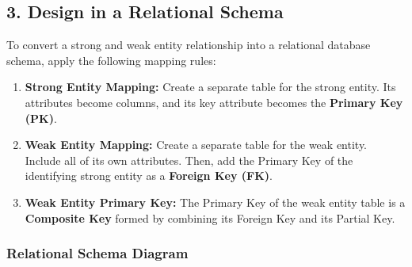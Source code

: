 \documentclass[12pt,a3paper]{article}
\begin{document}
\begin{enumerate}
\begin{tcolorbox}[enhanced,breakable,ansbox,colback=cA!4,colframe=cA,boxrule=0.8pt,arc=5pt,title={\textbf{Answer}},fonttitle=\bfseries\color{white},colbacktitle=cA]
\begin{center}
\end{center}
\vspace{1em}

\subsection*{3. Design in a Relational Schema}

To convert a strong and weak entity relationship into a relational database schema, apply the following mapping rules:

\begin{enumerate}
    \item \textbf{Strong Entity Mapping:} Create a separate table for the strong entity. Its attributes become columns, and its key attribute becomes the \textbf{Primary Key (PK)}.
    \item \textbf{Weak Entity Mapping:} Create a separate table for the weak entity. Include all of its own attributes. Then, add the Primary Key of the identifying strong entity as a \textbf{Foreign Key (FK)}.
    \item \textbf{Weak Entity Primary Key:} The Primary Key of the weak entity table is a \textbf{Composite Key} formed by combining its Foreign Key and its Partial Key.
\end{enumerate}

\subsubsection*{Relational Schema Diagram}

\vspace{1em}
\begin{center}
\end{center}
\end{tcolorbox}
\end{enumerate}
\end{document}
